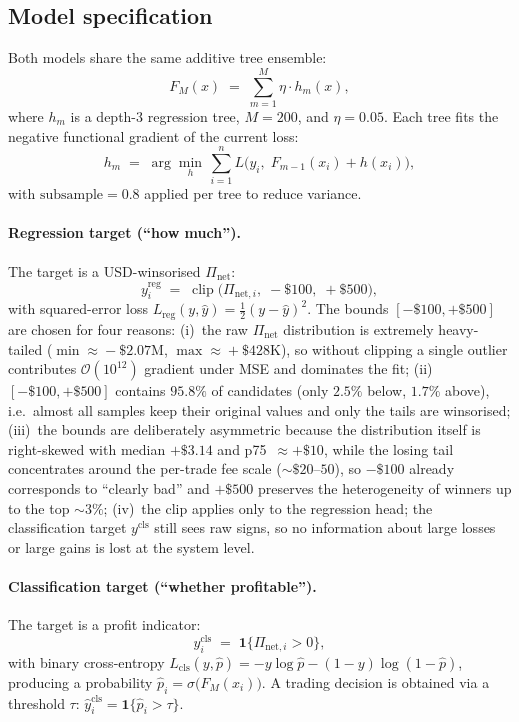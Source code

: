 \documentclass[sigconf,nonacm,10pt]{acmart}
\newcommand{\Pnet}{\Pi_{\text{net}}}
\begin{document}
\subsection{Model specification}

Both models share the same additive tree ensemble:
\begin{equation}
F_M(x) \;=\; \sum_{m=1}^{M} \eta \cdot h_m(x),
\label{eq:gbm}
\end{equation}
where $h_m$ is a depth-$3$ regression tree, $M=200$, and
$\eta=0.05$. Each tree fits the negative functional gradient of the
current loss:
\begin{equation}
h_m \;=\; \arg\min_{h}\,\sum_{i=1}^{n}
L\!\bigl(y_i,\; F_{m-1}(x_i)+h(x_i)\bigr),
\label{eq:gbm-update}
\end{equation}
with $\text{subsample}=0.8$ applied per tree to reduce variance.

\paragraph{Regression target (``how much'').}
The target is a USD-winsorised $\Pnet$:
\begin{equation}
y^{\text{reg}}_i \;=\; \operatorname{clip}\!\bigl(\Pi_{\text{net},i},\;
-\$100,\; +\$500\bigr),
\label{eq:reg-target}
\end{equation}
with squared-error loss
$L_{\text{reg}}(y,\hat y)=\tfrac12(y-\hat y)^2$.
The bounds $[-\$100,+\$500]$ are chosen for four reasons:
(i)~the raw $\Pnet$ distribution is extremely heavy-tailed
($\min\!\approx\!-\$2.07\text{M}$, $\max\!\approx\!+\$428\text{K}$),
so without clipping a single outlier contributes $\mathcal{O}(10^{12})$
gradient under MSE and dominates the fit;
(ii)~$[-\$100,+\$500]$ contains $95.8\%$ of candidates
(only $2.5\%$ below, $1.7\%$ above), i.e.\ almost all samples keep
their original values and only the tails are winsorised;
(iii)~the bounds are deliberately asymmetric because the distribution
itself is right-skewed with median $+\$3.14$ and p75~$\approx+\$10$,
while the losing tail concentrates around the per-trade fee scale
($\sim\!\$20$--$50$), so $-\$100$ already corresponds to
``clearly bad'' and $+\$500$ preserves the heterogeneity of winners
up to the top $\sim\!3\%$;
(iv)~the clip applies only to the regression head; the classification
target $y^{\text{cls}}$ still sees raw signs, so no information about
large losses or large gains is lost at the system level.

\paragraph{Classification target (``whether profitable'').}
The target is a profit indicator:
\begin{equation}
y^{\text{cls}}_i \;=\; \mathbf{1}\{\Pi_{\text{net},i}>0\},
\label{eq:cls-target}
\end{equation}
with binary cross-entropy
$L_{\text{cls}}(y,\hat p)=-y\log\hat p-(1-y)\log(1-\hat p)$,
producing a probability
$\hat p_i=\sigma\!\bigl(F_M(x_i)\bigr)$. A trading decision is
obtained via a threshold $\tau$:
$\hat y^{\text{cls}}_i=\mathbf{1}\{\hat p_i>\tau\}$.
\end{document}
